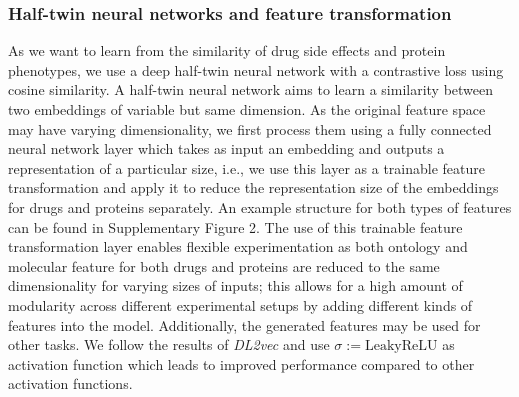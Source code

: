 \documentclass{bioinfo}
\renewcommand{\cite}{\citep}
\begin{document}



\subsubsection{Half-twin neural networks and feature transformation}

As we want to learn from the similarity of drug side effects and
protein phenotypes, we use a deep half-twin neural network with a
contrastive loss using cosine similarity.  A half-twin neural network
aims to learn a similarity between two embeddings of variable but same
dimension. As the original feature space may have varying
dimensionality, we first process them using a fully connected neural
network layer which takes as input an embedding and outputs a
representation of a particular size, i.e., we use this layer as a
trainable feature transformation and apply it to reduce the
representation size of the embeddings for drugs and proteins
separately.  An example structure for both types of features can be
found in Supplementary Figure 2.
The use of this trainable feature transformation layer enables
flexible experimentation as both ontology and molecular feature for
both drugs and proteins are reduced to the same dimensionality for
varying sizes of inputs; this allows for a high amount of modularity
across different experimental setups by adding different kinds of
features into the model. Additionally, the generated features may be
used for other tasks. %
We follow the results of \textit{DL2vec} \cite{DL2vec2020} and use
$\sigma := \mathrm{LeakyReLU}$ as activation function which leads to
improved performance compared to other activation functions.

\end{document}
